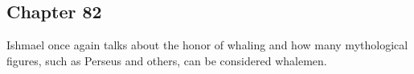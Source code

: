\subsection{Chapter 82}

Ishmael once again talks about the honor of whaling and how many mythological
figures, such as Perseus and others, can be considered whalemen.
